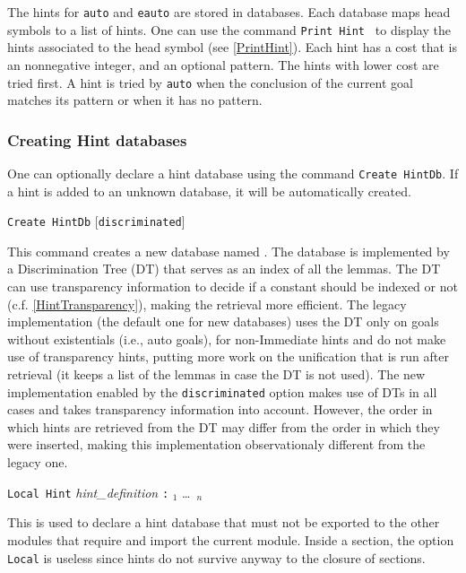 The hints for \texttt{auto} and \texttt{eauto} are stored in
databases.  Each database maps head symbols to a list of hints. One can
use the command \texttt{Print Hint \ident} to display the hints
associated to the head symbol \ident{} (see \ref{PrintHint}). Each
hint has a cost that is an nonnegative integer, and an optional pattern. 
The hints with lower cost are tried first. A hint is tried by 
\texttt{auto} when the conclusion of the current goal
matches its pattern or when it has no pattern. 

\subsubsection*{Creating Hint databases
  \label{CreateHintDb}}

One can optionally declare a hint database using the command
\texttt{Create HintDb}. If a hint is added to an unknown database, it
will be automatically created. 

\medskip
\texttt{Create HintDb} {\ident} [\texttt{discriminated}]
\medskip

This command creates a new database named \ident.
The database is implemented by a Discrimination Tree (DT) that serves as
an index of all the lemmas. The DT can use transparency information to decide
if a constant should be indexed or not (c.f. \ref{HintTransparency}),
making the retrieval more efficient.
The legacy implementation (the default one for new databases) uses the
DT only on goals without existentials (i.e., auto goals), for non-Immediate
hints and do not make use of transparency hints, putting more work on the
unification that is run after retrieval (it keeps a list of the lemmas
in case the DT is not used). The new implementation enabled by
the {\tt discriminated} option makes use of DTs in all cases and takes
transparency information into account. However, the order in which hints
are retrieved from the DT may differ from the order in which they were
inserted, making this implementation observationaly different from the
legacy one. 

\begin{Variants}
\item\texttt{Local Hint} \textsl{hint\_definition} \texttt{:}
  \ident$_1$ \ldots\ \ident$_n$
  
  This is used to declare a hint database that must not be exported to the other
  modules that require and import the current module. Inside a
  section, the option {\tt Local} is useless since hints do not
  survive anyway to the closure of sections.

\end{Variants}

